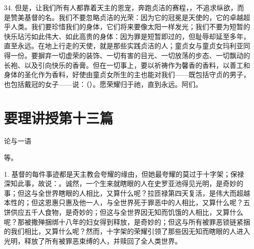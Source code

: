 34. 但是，让我们所有人都靠着天主的恩宠，奔跑贞洁的赛程，，不追求纵欲，而是赞美基督的名。我们不要忽略贞洁的光荣：因为它的冠冕是天使的，它的卓越超乎人类。我们要珍惜我们的身体，它们将来要像太阳一样发光；我们不要为短暂的快乐玷污如此伟大、如此高贵的身体：因为罪是短暂即过的，但耻辱却延至多年，直至永远。在地上行走的天使，就是那些实践贞洁的人；童贞女与童贞女玛利亚同得一份。要摒弃一切虚荣的装饰、一切有害的目光、一切放荡的步态、一切飘动的长袍、以及引向快乐的香膏。但在一切事上，要以祈祷作为馨香的香料，以善工和身体的圣化作为香料，好使由童贞女所生的主也能对我们——既包括守贞的男子，也包括戴冠的女子——说：（）。愿荣耀归于祂，直到永远。阿们。\par



\section{要理讲授第十三篇}

论与一语\par

\par

等。\par

1. 基督的每件事迹都是天主教会夸耀的缘由，但她最夸耀的莫过于十字架；保禄深知此事，故说：。诚然，一个生来就瞎眼的人在史罗亚池得见光明，是奇妙的事；但这与全世界瞎眼的人相比，又算什么呢？拉匝禄第四天复活，是伟大而超越本性的；但这恩惠只惠及他一人，与全世界死于罪恶中的人相比，又算什么呢？五饼供应五千人食物，是奇妙的；但这与全世界因无知而饥饿的人相比，又算什么呢？那被撒殚捆绑十八年的妇女得到释放，是奇妙的；但这与所有被罪恶锁链紧捆的我们相比，又算什么呢？然而，十字架的荣耀引领了那些因无知而瞎眼的人进入光明，释放了所有被罪恶束缚的人，并赎回了全人类世界。\par

